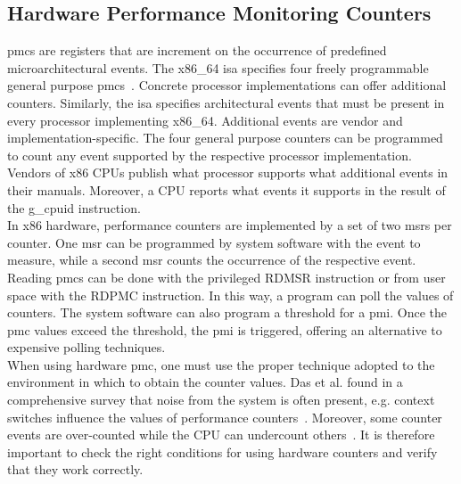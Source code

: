 \subsection{Hardware Performance Monitoring Counters}
\label{sec:state:technical:hpc}
\glspl{pmc} are registers that are increment on the occurrence of predefined
microarchitectural events. The x86\_64 \gls{isa} specifies four freely
programmable general purpose \glspl{pmc}~\cite{amd_manual}. Concrete processor
implementations can offer additional counters. Similarly, the \gls{isa}
specifies architectural events that must be present in every processor
implementing x86\_64. Additional events are vendor and implementation-specific.
The four general purpose counters can be programmed to count any event supported
by the respective processor implementation. Vendors of x86 CPUs publish what
processor supports what additional events in their manuals. Moreover, a CPU
reports what events it supports in the result of the \gls{g_cpuid} instruction.
\\

In x86 hardware, performance counters are implemented by a set of two
\glspl{msr} per counter. One \gls{msr} can be programmed by system software with
the event to measure, while a second \gls{msr} counts the occurrence of the
respective event. Reading \glspl{pmc} can be done with the privileged RDMSR
instruction or from user space with the RDPMC instruction. In this way, a
program can poll the values of counters. The system software can also program a
threshold for a \gls{pmi}. Once the \gls{pmc} values exceed the threshold, the
\gls{pmi} is triggered, offering an alternative to expensive polling
techniques.\\

When using hardware \gls{pmc}, one must use the proper technique adopted to the
environment in which to obtain the counter values. Das et al. found in a
comprehensive survey that noise from the system is often present, e.g. context
switches influence the values of performance counters~\cite{das_sok_2019}.
Moreover, some counter events are over-counted while the CPU can undercount
others~\cite{weaver_non-determinism_2013}. It is therefore important to check
the right conditions for using hardware counters and verify that they work
correctly.

